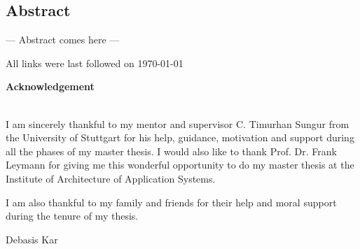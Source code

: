 \documentclass[paper=a4,       %
			 11pt,
			 BCOR0mm,  %
			 DIV10,    %
			 automark, %
			 twoside,
			 halfparskip,
			 bibtotoc,
			 headsepline,
			 normalheadings,
			 appendixprefix,
			 pagesize  %
 ]{scrbook}
\begin{document}
\restoregeometry
\cleardoubleemptypage

\setlength{\parindent}{0.0em}


\begin{center}
\section*{Abstract}
\end{center}
\pagestyle{empty}
--- Abstract comes here ---

\cleardoubleemptypage
\pagestyle{scrheadings}
\tableofcontents
\newpage
\let\cleardoublepage\clearpage

\listoffigures
\let\cleardoublepage\clearpage
\let\cleardoublepage\relax
\listoftables
\let\cleardoublepage\clearpage
\renewcommand{\lstlistlistingname}{List of Listings}
\lstlistoflistings
\let\cleardoublepage\clearpage
\cleardoubleemptypage


\newpage












All links were last followed on \today

\clearpage
\pagestyle{empty}

\pagestyle{empty}
\vspace{9cm}
\begin{center}
	\begin{minipage}{11cm}
		\vspace{6cm}
		\textbf{\Large Acknowledgement}\\\\
		\vspace{0.4cm}

		I am sincerely thankful to my mentor and supervisor C. Timurhan Sungur from the University of Stuttgart for his help, guidance, motivation and support during all the phases of my master thesis. I would also like to thank Prof. Dr. Frank Leymann for giving me this wonderful opportunity to do my master thesis at the Institute of Architecture of Application Systems.
		\vspace{0.4cm}
		 
		I am also thankful to my family and friends for their help and moral support during the tenure of my thesis.
		\vspace{1cm}
		
		Debasis Kar
	\end{minipage}
\end{center}
\end{document}
